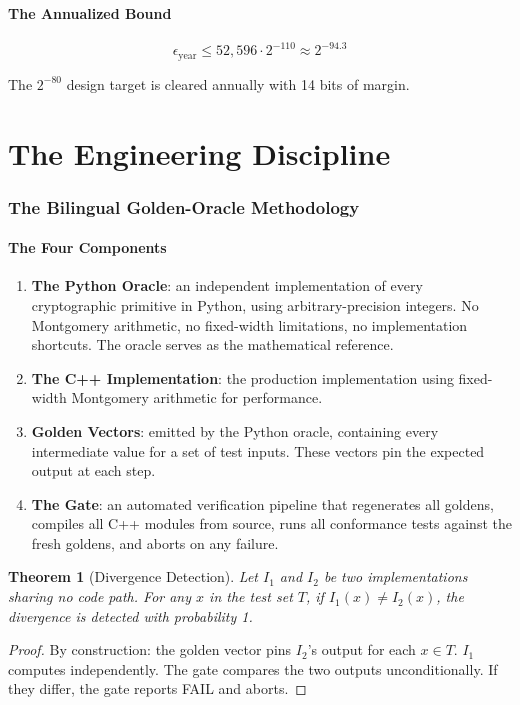 \documentclass[11pt, a4paper]{article}
\theoremstyle{plain}
\newtheorem{theorem}{Theorem}
\theoremstyle{definition}
\theoremstyle{remark}
\begin{document}
\subsection{The Annualized Bound}

\begin{equation}
\epsilon_{\text{year}} \le 52{,}596 \cdot 2^{-110} \approx 2^{-94.3}
\end{equation}

The $2^{-80}$ design target is cleared annually with 14 bits of margin.

\part{The Engineering Discipline}

\section{The Bilingual Golden-Oracle Methodology}
\label{sec:methodology}

\subsection{The Four Components}

\begin{enumerate}
\item \textbf{The Python Oracle}: an independent implementation of
every cryptographic primitive in Python, using arbitrary-precision
integers. No Montgomery arithmetic, no fixed-width limitations, no
implementation shortcuts. The oracle serves as the mathematical
reference.
\item \textbf{The C++ Implementation}: the production implementation
using fixed-width Montgomery arithmetic for performance.
\item \textbf{Golden Vectors}: emitted by the Python oracle, containing
every intermediate value for a set of test inputs. These vectors pin
the expected output at each step.
\item \textbf{The Gate}: an automated verification pipeline that
regenerates all goldens, compiles all C++ modules from source, runs
all conformance tests against the fresh goldens, and aborts on any
failure.
\end{enumerate}

\begin{theorem}[Divergence Detection]
\label{thm:divergence}
Let $I_1$ and $I_2$ be two implementations sharing no code path. For
any $x$ in the test set $T$, if $I_1(x) \neq I_2(x)$, the divergence
is detected with probability 1.
\end{theorem}
\begin{proof}
By construction: the golden vector pins $I_2$'s output for each
 $x \in T$. $I_1$ computes independently. The gate compares the two
outputs unconditionally. If they differ, the gate reports FAIL and
aborts.
\end{proof}
\end{document}
